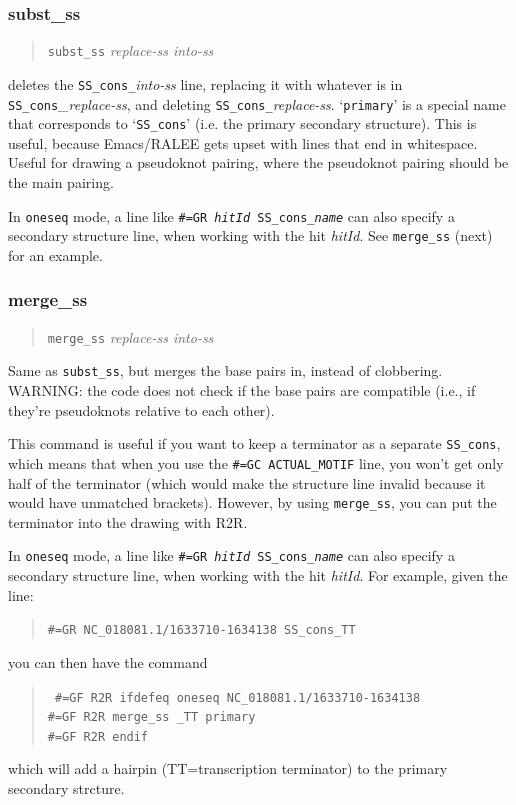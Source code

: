 \documentclass[letterpaper,12pt]{report}
\newcommand{\example}[1]{
\begin{quote}
{\raggedright
#1
}
\end{quote}
}
\newcommand{\examplett}[1]{
\example{{\tt #1}}
}
\begin{document}
\subsubsection{subst\_ss}
\example{{\tt subst\_ss}  \textit{replace-ss  into-ss}}

deletes the {\tt SS\_cons\_}\textit{into-ss }line, replacing it with whatever
is in {\tt SS\_cons}\textit{\_replace-ss}, and deleting
{\tt SS\_cons\_}\textit{replace-ss}. 
{\textquoteleft}{\tt primary}{\textquoteright} is a special name that
corresponds to {\textquoteleft}{\tt SS\_cons}{\textquoteright} (i.e. the
primary secondary structure).  This is useful, because Emacs/RALEE gets
upset with lines that end in whitespace.  Useful for drawing a
pseudoknot pairing, where the
pseudoknot pairing should be the main pairing.

In {\tt oneseq} mode, a line like {\tt \#=GR {\it hitId} SS\_cons\_{\it name}} can also specify a secondary structure line, when working with the hit {\it hitId}.  See {\tt merge\_ss} (next) for an example.

\subsubsection{merge\_ss}
\example{{\tt merge\_ss}  \textit{replace-ss  into-ss}}

Same as {\tt subst\_ss}, but merges the base pairs in, instead of clobbering. 
WARNING: the code does not check if the base pairs are compatible
(i.e., if they{\textquoteright}re pseudoknots relative to each other).

This command is useful if you want to keep a terminator as a separate
{\tt SS\_cons}, which means that when you use the {\tt \#=GC ACTUAL\_MOTIF} line,
you won{\textquoteright}t get only half of the terminator
(which would make the structure line invalid because it would have
unmatched brackets).  However, by
using {\tt merge\_ss}, you can put the terminator into the drawing with
R2R.

In {\tt oneseq} mode, a line like {\tt \#=GR {\it hitId} SS\_cons\_{\it name}} can also specify a secondary structure line, when working with the hit {\it hitId}.  For example, given the line:
\examplett{\#=GR NC\_018081.1/1633710-1634138 SS\_cons\_TT}
you can then have the command
\examplett{
\#=GF R2R ifdefeq oneseq NC\_018081.1/1633710-1634138\\
\#=GF R2R merge\_ss \_TT primary\\
\#=GF R2R endif
}
which will add a hairpin (TT=transcription terminator) to the primary secondary strcture.
\end{document}
